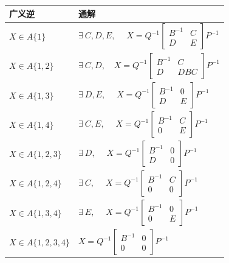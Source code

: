 \begin{table}[H]
    \centering
    \label{tab:pseudoinv}
    \begin{tabular}{ll}
    \toprule
    \textbf{广义逆} & \textbf{通解} \\ \midrule
    $X \in A\{1\}$ & $\exists\ C,D,E,\quad\;X=Q^{-1}\begin{bmatrix}B^{-1}&C\\D&E\end{bmatrix}P^{-1}$ \\
    $X \in A\{1,2\}$ & $\exists\ C,D,\quad X=Q^{-1}\begin{bmatrix}B^{-1}&C\\D&DBC\end{bmatrix}P^{-1}$ \\
    $X \in A\{1,3\}$ & $\exists\ D,E,\quad\;X=Q^{-1}\begin{bmatrix}B^{-1}&0\\D&E\end{bmatrix}P^{-1}$ \\
    $X \in A\{1,4\}$ & $\exists\ C,E,\quad\;X=Q^{-1}\begin{bmatrix}B^{-1}&C\\0&E\end{bmatrix}P^{-1}$ \\
    $X \in A\{1,2,3\}$ & $\exists\ D,\quad\;X=Q^{-1}\begin{bmatrix}B^{-1}&0\\D&0\end{bmatrix}P^{-1}$ \\
    $X \in A\{1,2,4\}$ & $\exists\ C,\quad\;X=Q^{-1}\begin{bmatrix}B^{-1}&C\\0&0\end{bmatrix}P^{-1}$ \\
    $X \in A\{1,3,4\}$ & $\exists\ E,\quad\;X=Q^{-1}\begin{bmatrix}B^{-1}&0\\0&E\end{bmatrix}P^{-1}$ \\
    $X \in A\{1,2,3,4\}$ & $X=Q^{-1}\begin{bmatrix}B^{-1}&0\\0&0\end{bmatrix}P^{-1}$ \\ \bottomrule
    \end{tabular}
\end{table}

